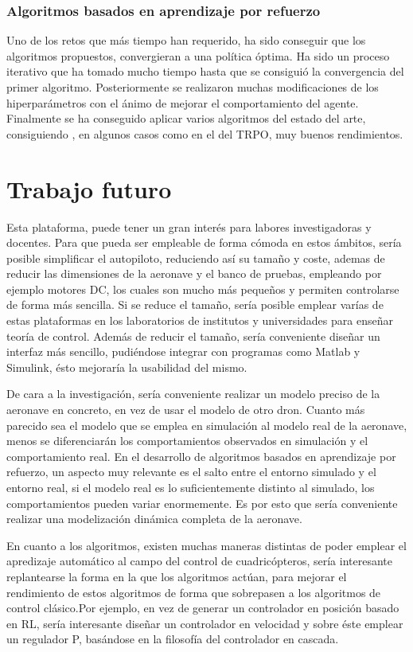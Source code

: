 \subsubsection{Algoritmos basados en aprendizaje por refuerzo}

Uno de los retos que más tiempo han requerido, ha sido conseguir que los algoritmos propuestos, convergieran a una política óptima. Ha sido un proceso iterativo que ha tomado mucho tiempo hasta que se consiguió la convergencia del primer algoritmo. Posteriormente se realizaron muchas modificaciones de los hiperparámetros con el ánimo de mejorar el comportamiento del agente. Finalmente se ha conseguido aplicar varios algoritmos del estado del arte, consiguiendo , en algunos casos como en el del TRPO, muy buenos rendimientos.

\section{Trabajo futuro}

Esta plataforma, puede tener un gran interés para labores investigadoras y docentes. Para que pueda ser empleable de forma cómoda en estos ámbitos, sería posible simplificar el autopiloto, reduciendo así su tamaño y coste, ademas de reducir las dimensiones de la aeronave y el banco de pruebas, empleando por ejemplo motores DC, los cuales son mucho más pequeños y permiten controlarse de forma más sencilla. Si se reduce el tamaño, sería posible emplear varías de estas plataformas en los laboratorios de institutos y universidades para enseñar teoría de control. Además de reducir el tamaño, sería conveniente diseñar un interfaz más sencillo, pudiéndose integrar con programas como Matlab y Simulink, ésto mejoraría la usabilidad del mismo.

De cara a la investigación, sería conveniente realizar un modelo preciso de la aeronave en concreto, en vez de usar el modelo de otro dron. Cuanto más parecido sea el modelo que se emplea en simulación al modelo real de la aeronave, menos se diferenciarán los comportamientos observados en simulación y el comportamiento real. En el desarrollo de algoritmos basados en aprendizaje por refuerzo, un aspecto muy relevante es el salto entre el entorno simulado y el entorno real, si el modelo real es lo suficientemente distinto al simulado, los comportamientos pueden variar enormemente. Es por esto que sería conveniente realizar una modelización dinámica completa de la aeronave.

En cuanto a los algoritmos, existen muchas maneras distintas de poder emplear el apredizaje automático al campo del control de cuadricópteros, sería interesante replantearse la forma en la que los algoritmos actúan, para mejorar el rendimiento de estos algoritmos de forma que sobrepasen a los algoritmos de control clásico.Por ejemplo, en vez de generar un controlador en posición basado en RL, sería interesante diseñar un controlador en velocidad y sobre éste emplear un regulador P, basándose en la filosofía del controlador en cascada.  







	